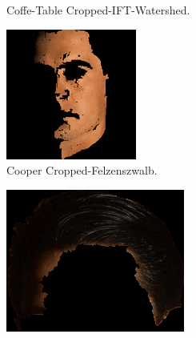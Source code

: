 \documentclass{sbc2023}
\begin{document}
\begin{figure}[H]
\begin{subfigure}[b]{0.14\textwidth}
            \caption{Coffe-Table Cropped-IFT-Watershed.}
            \label{fig:coffe-table_cropped_ift}
        \end{subfigure}
        \hfill
        \begin{subfigure}[b]{0.14\textwidth}
            \includegraphics[width=\textwidth]{imgs/Cooper_felzenszwalb_cropped_segment.png}
            \caption{Cooper Cropped-Felzenszwalb.}
            \label{fig:cooper_cropped_felzenszwalb}
        \end{subfigure}
    \hfill
        \begin{subfigure}[b]{0.14\textwidth}
            \includegraphics[width=\textwidth]{imgs/Cooper_ift_watershed_cropped_segment.png}

\end{subfigure}
\end{figure}
\end{document}
